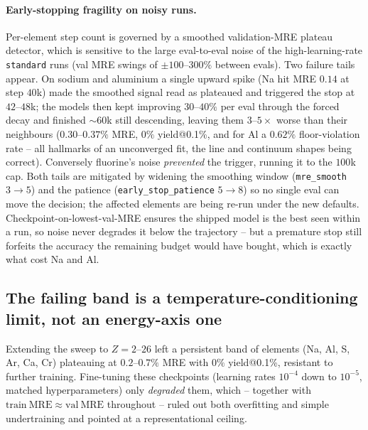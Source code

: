\documentclass[11pt,a4paper]{article}
\newcommand{\code}[1]{\texttt{#1}}
\begin{document}
\paragraph{Early-stopping fragility on noisy runs.} Per-element step
count is governed by a smoothed validation-MRE plateau detector, which is
sensitive to the large eval-to-eval noise of the high-learning-rate
\code{standard} runs (val MRE swings of $\pm100$--$300\%$ between evals).
Two failure tails appear. On sodium and aluminium a single upward spike
(Na hit MRE $0.14$ at step $40$k) made the smoothed signal read as
plateaued and triggered the stop at $42$--$48$k; the models then kept
improving $30$--$40\%$ per eval through the forced decay and finished
$\sim60$k still descending, leaving them $3$--$5\times$ worse than their
neighbours ($0.30$--$0.37\%$ MRE, $0\%$ yield@0.1\%, and for Al a
$0.62\%$ floor-violation rate -- all hallmarks of an unconverged fit, the
line and continuum shapes being correct). Conversely fluorine's noise
\emph{prevented} the trigger, running it to the $100$k cap. Both tails are
mitigated by widening the smoothing window (\code{mre\_smooth} $3\to5$) and
the patience (\code{early\_stop\_patience} $5\to8$) so no single eval can
move the decision; the affected elements are being re-run under the new
defaults. Checkpoint-on-lowest-val-MRE ensures the shipped model is the
best seen within a run, so noise never degrades it below the trajectory
-- but a premature stop still forfeits the accuracy the remaining budget
would have bought, which is exactly what cost Na and Al.

\subsection{The failing band is a temperature-conditioning limit, not an
energy-axis one}
\label{sec:tembed}
Extending the sweep to $Z=2$--$26$ left a persistent band of elements
(Na, Al, S, Ar, Ca, Cr) plateauing at $0.2$--$0.7\%$ MRE with $0\%$
yield@0.1\%, resistant to further training. Fine-tuning these checkpoints
(learning rates $10^{-4}$ down to $10^{-5}$, matched hyperparameters) only
\emph{degraded} them, which -- together with $\mathrm{train\ MRE}\approx
\mathrm{val\ MRE}$ throughout -- ruled out both overfitting and simple
undertraining and pointed at a representational ceiling.
\end{document}
